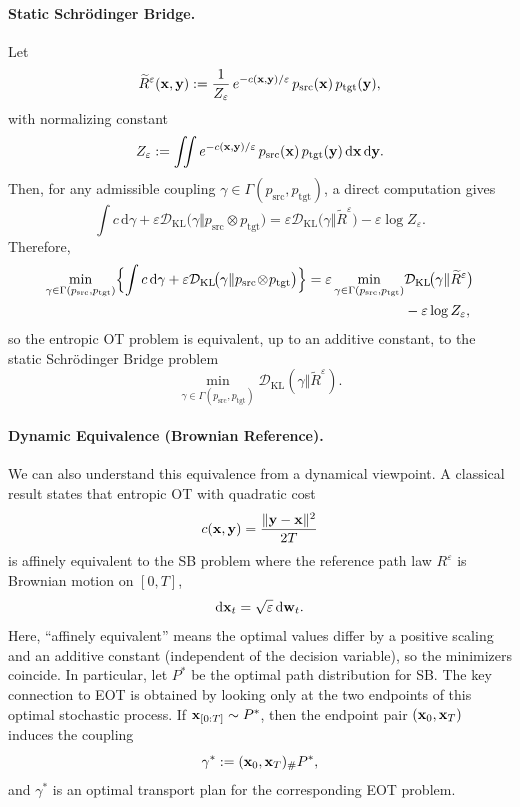 \paragraph{Static Schr\"odinger Bridge.}
Let
\[
  \widetilde R^\varepsilon({\mathbf{x}},{\mathbf{y}})
  := \frac{1}{Z_\varepsilon}\,e^{-c({\mathbf{x}},{\mathbf{y}})/\varepsilon}\,p_{\mathrm{src}}({\mathbf{x}})\,p_{\mathrm{tgt}}({\mathbf{y}}),
\]
with normalizing constant
\[
Z_\varepsilon := \iint e^{-c({\mathbf{x}}, {\mathbf{y}})/\varepsilon}\, p_{\mathrm{src}}({\mathbf{x}})\, p_{\mathrm{tgt}}({\mathbf{y}})\,\mathrm d{\mathbf{x}}\,\mathrm d{\mathbf{y}}.
\]
Then, for any admissible coupling \(\gamma\in\Gamma(p_{\mathrm{src}},p_{\mathrm{tgt}})\), a direct computation gives
\[
\int c\, \mathrm d\gamma
+\varepsilon \mathcal{D}_\mathrm{KL}\!\bigl(\gamma \Vert p_{\mathrm{src}}\!\otimes\!p_{\mathrm{tgt}}\bigr)
=
\varepsilon \mathcal{D}_\mathrm{KL}\!\bigl(\gamma \Vert \widetilde R^\varepsilon\bigr)
-\varepsilon\log Z_\varepsilon.
\]
Therefore,
\begin{align}
\begin{aligned}\label{eq:eot-sb-static}
    \min_{\gamma\in\Gamma(p_{\mathrm{src}},p_{\mathrm{tgt}})}
  \Bigl\{\int c \,\mathrm d\gamma
  + \varepsilon \mathcal{D}_\mathrm{KL}\!\bigl(\gamma \Vert p_{\mathrm{src}}\!\otimes\!p_{\mathrm{tgt}}\bigr)\Bigr\}
  = \varepsilon \min_{\gamma\in\Gamma(p_{\mathrm{src}},p_{\mathrm{tgt}})}
  &\mathcal{D}_\mathrm{KL}\!\bigl(\gamma \Vert \widetilde R^\varepsilon\bigr)
  \\&-\varepsilon\log Z_\varepsilon,
\end{aligned}
\end{align}
so the entropic OT problem is equivalent, up to an additive constant, to the static Schr\"odinger Bridge problem
\[
\min_{\gamma\in\Gamma(p_{\mathrm{src}},p_{\mathrm{tgt}})}
\mathcal{D}_\mathrm{KL}(\gamma\Vert \widetilde R^\varepsilon).
\]

\paragraph{Dynamic Equivalence (Brownian Reference).} We can also understand this equivalence from a dynamical viewpoint. 
A classical result \citep{mikami2006duality} states  that entropic OT with quadratic cost
\[
c({\mathbf{x}},{\mathbf{y}})=\frac{\|{\mathbf{y}}-{\mathbf{x}}\|^2}{2T}
\]
is affinely equivalent to the SB problem where the
reference path law $R^\varepsilon$ is Brownian motion on $[0,T]$,
\[
\mathrm{d}{\mathbf{x}}_t=\sqrt{\varepsilon}\,\mathrm{d}{\mathbf{w}}_t.
\]
Here, ``affinely equivalent'' means the optimal values differ by a positive scaling and an
additive constant (independent of the decision variable), so the minimizers coincide.
In particular, let $P^*$ be the optimal path distribution for SB. The key
connection to EOT is obtained by looking only at the two endpoints of this
optimal stochastic process. If
${\mathbf{x}}_{[0:T]}\sim P^*$, then the endpoint pair
$({\mathbf{x}}_0,{\mathbf{x}}_T)$ induces the coupling
\[
\gamma^*:=({\mathbf{x}}_0,{\mathbf{x}}_T)_\#P^*,
\]
and $\gamma^*$ is an optimal transport plan for the corresponding EOT
problem.

